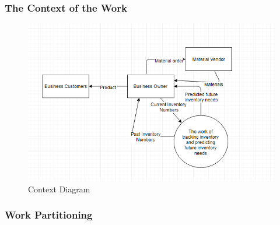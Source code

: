 \documentclass[12pt, titlepage]{article}
\begin{document}
\subsubsection{The Context of the Work}
\begin{figure}[h]
    \centering
    \includegraphics[scale = 1]{./img/ContextDiagram.jpg}
    \caption{Context Diagram}
    \label{fig:image1}
\end{figure}

\newpage
\subsubsection{Work Partitioning}
\end{document}
